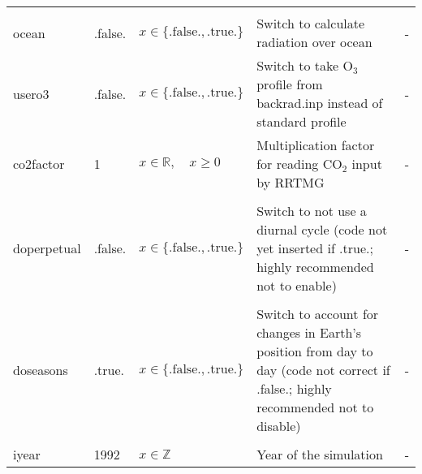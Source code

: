 \documentclass[twoside,11pt,fleqn,a4paper,english,openright]{report}
\begin{document}
\begin{center}
\begin{supertabular}{|l|p{2cm}|p{4cm}|p{6cm}|l|}
 &&&&\\
 ocean		& .false.	& $x\in\{\text{.false.},\text{.true.}\}$	& Switch to calculate radiation over ocean	& -\\
 usero3		& .false.	& $x\in\{\text{.false.},\text{.true.}\}$	& Switch to take O$_3$ profile from backrad.inp instead of standard profile	& -\\
 co2factor	& 1			& $x \in \mathbb{R},\quad x \geq 0$			& Multiplication factor for reading CO$_2$ input by RRTMG	& - \\
 &&&&\\
 doperpetual	& .false.	& $x\in\{\text{.false.},\text{.true.}\}$	& \parbox{6cm}{Switch to not use a diurnal cycle	(code not yet inserted if .true.; highly recommended not to enable)}& -\\
  &&&&\\
 doseasons	& .true.	& $x\in\{\text{.false.},\text{.true.}\}$	& \parbox{6cm}{Switch to account for changes in Earth's position from day to day (code not correct if .false.; highly recommended not to disable)} & -\\
  &&&&\\
 iyear	& 1992			& $x\in\mathbb{Z}$	& Year of the simulation & -\\
\end{supertabular}
\end{center}
\end{document}
